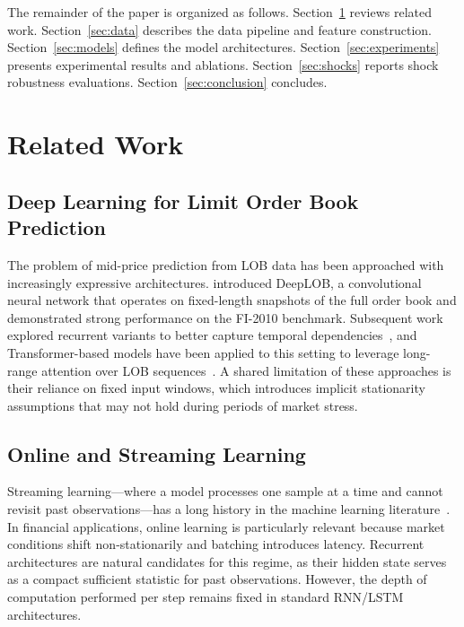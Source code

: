 \documentclass[11pt]{article}
\begin{document}
The remainder of the paper is organized as follows. Section~\ref{sec:related}
reviews related work. Section~\ref{sec:data} describes the data pipeline and
feature construction. Section~\ref{sec:models} defines the model architectures.
Section~\ref{sec:experiments} presents experimental results and ablations.
Section~\ref{sec:shocks} reports shock robustness evaluations.
Section~\ref{sec:conclusion} concludes.

\section{Related Work}
\label{sec:related}

\subsection{Deep Learning for Limit Order Book Prediction}

The problem of mid-price prediction from LOB data has been approached with
increasingly expressive architectures. \citet{zhang2019deeplob} introduced
DeepLOB, a convolutional neural network that operates on fixed-length snapshots
of the full order book and demonstrated strong performance on the FI-2010
benchmark. Subsequent work explored recurrent variants to better capture
temporal dependencies~\citep{sirignano2019deep}, and Transformer-based models
have been applied to this setting to leverage long-range attention over LOB
sequences~\citep{wallbridge2020transformers}. A shared limitation of these
approaches is their reliance on fixed input windows, which introduces implicit
stationarity assumptions that may not hold during periods of market stress.

\subsection{Online and Streaming Learning}

Streaming learning---where a model processes one sample at a time and cannot
revisit past observations---has a long history in the machine learning
literature~\citep{bottou1998online}. In financial applications, online learning
is particularly relevant because market conditions shift non-stationarily and
batching introduces latency. Recurrent architectures are natural candidates for
this regime, as their hidden state serves as a compact sufficient statistic for
past observations. However, the depth of computation performed per step remains
fixed in standard RNN/LSTM architectures.
\end{document}
